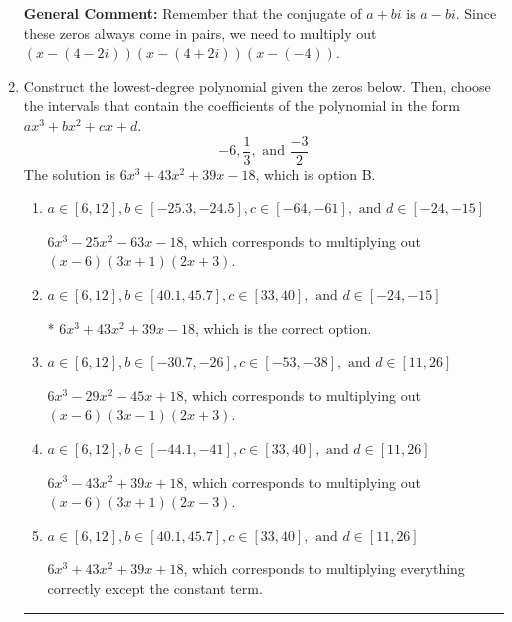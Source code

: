 \documentclass{extbook}[14pt]
\newcommand{\litem}[1]{\item #1

\rule{\textwidth}{0.4pt}}
\begin{document}
\begin{enumerate}
{\textbf{General Comment:} Remember that the conjugate of $a+bi$ is $a-bi$. Since these zeros always come in pairs, we need to multiply out $(x-(4 - 2 i))(x-(4 + 2 i))(x-(-4))$.
}
\litem{
Construct the lowest-degree polynomial given the zeros below. Then, choose the intervals that contain the coefficients of the polynomial in the form $ax^3+bx^2+cx+d$.
\[ -6, \frac{1}{3}, \text{ and } \frac{-3}{2} \]The solution is \( 6x^{3} +43 x^{2} +39 x -18 \), which is option B.\begin{enumerate}[label=\Alph*.]
\item \( a \in [6, 12], b \in [-25.3, -24.5], c \in [-64, -61], \text{ and } d \in [-24, -15] \)

$6x^{3} -25 x^{2} -63 x -18$, which corresponds to multiplying out $(x -6)(3x + 1)(2x + 3)$.
\item \( a \in [6, 12], b \in [40.1, 45.7], c \in [33, 40], \text{ and } d \in [-24, -15] \)

* $6x^{3} +43 x^{2} +39 x -18$, which is the correct option.
\item \( a \in [6, 12], b \in [-30.7, -26], c \in [-53, -38], \text{ and } d \in [11, 26] \)

$6x^{3} -29 x^{2} -45 x + 18$, which corresponds to multiplying out $(x -6)(3x -1)(2x + 3)$.
\item \( a \in [6, 12], b \in [-44.1, -41], c \in [33, 40], \text{ and } d \in [11, 26] \)

$6x^{3} -43 x^{2} +39 x + 18$, which corresponds to multiplying out $(x -6)(3x + 1)(2x -3)$.
\item \( a \in [6, 12], b \in [40.1, 45.7], c \in [33, 40], \text{ and } d \in [11, 26] \)

$6x^{3} +43 x^{2} +39 x + 18$, which corresponds to multiplying everything correctly except the constant term.
\end{enumerate}

}
\end{enumerate}
\end{document}
